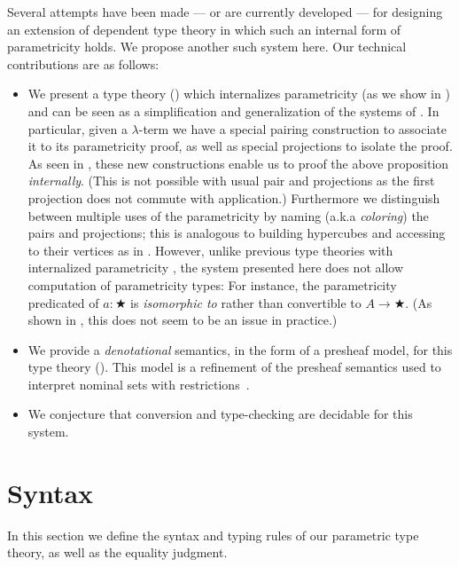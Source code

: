 \documentclass[english]{PaperTools/latex/lipics}
\begin{document}
Several attempts have been made
\citep{bernardy_computational_2012,bernardy_type-theory_2013} --- or are currently
developed \citep{altenkirch2014syntax} ---
for designing an extension of dependent type theory in which such an internal form of
parametricity holds. We propose another such system here.
Our technical contributions are as follows:
\begin{itemize}
\item We present a type theory () which internalizes parametricity (as we show in )
  and can be seen as a simplification and generalization of the systems of
  \cite{bernardy_computational_2012,bernardy_type-theory_2013}.
  In particular, given a $λ$-term we have a special pairing construction
  to associate it to its parametricity proof, as well as special
  projections to isolate the proof. As seen in , these
  new constructions enable us to proof the above proposition
  \emph{internally}.  (This is not possible with usual pair and
  projections as the first projection does not commute with
  application.)  Furthermore we distinguish between multiple uses of the
  parametricity by naming (a.k.a \emph{coloring}) the pairs and
  projections; this is analogous to building hypercubes and accessing to
  their vertices as in \citep{bernardy_computational_2012}.
  However, unlike previous type theories with internalized parametricity
  \citep{bernardy_computational_2012, bernardy_type-theory_2013}, the
  system presented here does not allow computation of parametricity types:
  For instance, the parametricity predicated of $a : ★$ is
  \emph{isomorphic to} rather than convertible to $A → ★$.  (As shown in
  , this does not seem to be an issue in
  practice.)
\item We provide a \emph{denotational} semantics, in the form of a presheaf model, for this type theory ().
      This model is a refinement of the presheaf semantics used to
      interpret nominal sets with
      restrictions~\citep{bezem2014model,DBLP:journals/corr/Pitts14}.
\item We conjecture that conversion and type-checking are decidable for this system.
\end{itemize}

\section{Syntax}
\label{sec:syntax}
In this section we define the syntax and typing rules of our
parametric type theory, as well as the equality judgment.
\end{document}
